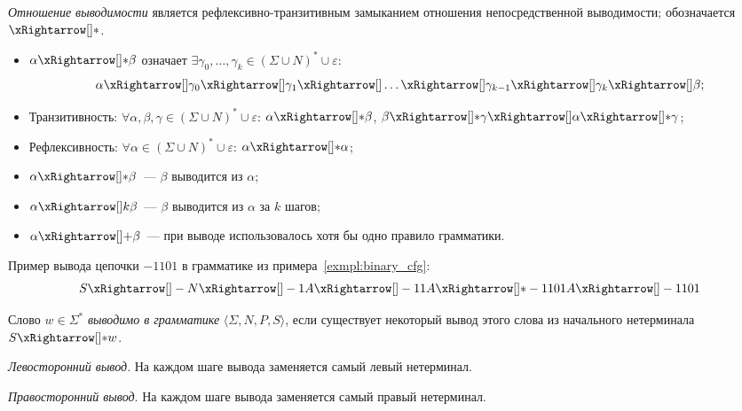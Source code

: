 \begin{definition}
    \emph{Отношение выводимости} является рефлексивно-транзитивным замыканием отношения непосредственной выводимости; обозначается $\derives$.
    \begin{itemize}
        \item $\alpha \derives \beta$ означает $\exists \gamma_0, \dots, \gamma_k \in (\Sigma \cup N)^* \cup {\varepsilon}$:
              \[ \alpha \derives[] \gamma_0 \derives[] \gamma_1 \derives[] \dots \derives[] \gamma_{k-1} \derives[] \gamma_{k} \derives[] \beta;\]
        \item Транзитивность: $\forall \alpha, \beta, \gamma \in (\Sigma \cup N)^* \cup {\varepsilon}$: $\alpha \derives \beta$, $\beta \derives \gamma \derives[] \alpha \derives \gamma$;
        \item Рефлексивность: $\forall \alpha \in (\Sigma \cup N)^* \cup {\varepsilon}$: $\alpha \derives \alpha$;
        \item $\alpha \derives \beta$~--- $\beta$ выводится из $\alpha$;
        \item $\alpha \derives[k] \beta$~--- $\beta$ выводится из $\alpha$ за $k$ шагов;
        \item $\alpha \derives[+] \beta$~--- при выводе использовалось хотя бы одно правило грамматики.
    \end{itemize}
\end{definition}

\begin{example}
    Пример вывода цепочки $-1101$ в грамматике из примера~\ref{exmpl:binary_cfg}:
    \[
        S \derives[] - N \derives[] - 1 A \derives[] - 1 1 A \derives - 1 1 0 1 A \derives[] - 1 1 0 1
    \]
\end{example}

\begin{definition}
    Слово $w \in \Sigma^*$ \emph{выводимо в грамматике} $\langle \Sigma, N, P, S \rangle$, если существует некоторый вывод этого слова из начального нетерминала $S \derives w$.

\end{definition}

\begin{definition}
    \emph{Левосторонний вывод}. На каждом шаге вывода заменяется самый левый нетерминал.
\end{definition}

\begin{definition}
    \emph{Правосторонний вывод}. На каждом шаге вывода заменяется самый правый нетерминал.
\end{definition}

